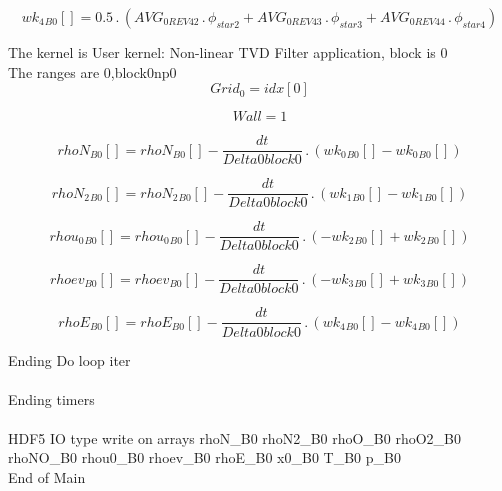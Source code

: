 \documentclass{article}
\begin{document}
\begin{dmath}{wk_{4}{_{B0}}}[{}] = 0.5 \,.\, \left(AVG_{0 REV 42} \,.\, \phi_{star 2} + AVG_{0 REV 43} \,.\, \phi_{star 3} + AVG_{0 REV 44} \,.\, \phi_{star 4}\right)\end{dmath}

\noindent The kernel is User kernel: Non-linear TVD Filter application, block is 0\\\noindent The ranges are 0,block0np0\\\begin{dmath}Grid_{0} = {idx}[{0}]\end{dmath}

\begin{dmath}Wall = 1\end{dmath}

\begin{dmath}{rhoN{_{B0}}}[{}] = {rhoN{_{B0}}}[{}] - \frac{dt}{Delta0block0} \,.\, \left({wk_{0}{_{B0}}}[{}] - {wk_{0}{_{B0}}}[{}]\right)\end{dmath}

\begin{dmath}{rhoN_{2}{_{B0}}}[{}] = {rhoN_{2}{_{B0}}}[{}] - \frac{dt}{Delta0block0} \,.\, \left({wk_{1}{_{B0}}}[{}] - {wk_{1}{_{B0}}}[{}]\right)\end{dmath}

\begin{dmath}{rhou_{0}{_{B0}}}[{}] = {rhou_{0}{_{B0}}}[{}] - \frac{dt}{Delta0block0} \,.\, \left(- {wk_{2}{_{B0}}}[{}] + {wk_{2}{_{B0}}}[{}]\right)\end{dmath}

\begin{dmath}{rhoev{_{B0}}}[{}] = {rhoev{_{B0}}}[{}] - \frac{dt}{Delta0block0} \,.\, \left(- {wk_{3}{_{B0}}}[{}] + {wk_{3}{_{B0}}}[{}]\right)\end{dmath}

\begin{dmath}{rhoE{_{B0}}}[{}] = {rhoE{_{B0}}}[{}] - \frac{dt}{Delta0block0} \,.\, \left({wk_{4}{_{B0}}}[{}] - {wk_{4}{_{B0}}}[{}]\right)\end{dmath}

\noindent Ending Do loop iter\\
\\\noindent Ending timers\\
\\\noindent HDF5 IO type write on arrays rhoN_B0 rhoN2_B0 rhoO_B0 rhoO2_B0 rhoNO_B0 rhou0_B0 rhoev_B0 rhoE_B0 x0_B0 T_B0 p_B0\\\noindent End of Main\\
\end{document}
